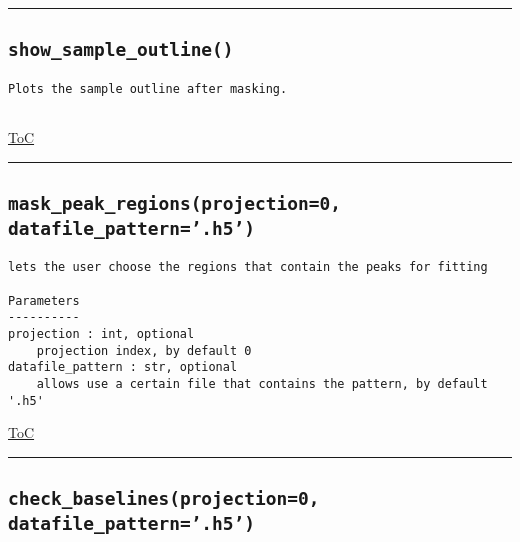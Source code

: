\documentclass{article}
\begin{document}
\vspace{5mm}

\hrule

\subsection*{\texttt{show\_sample\_outline()}}
\label{fun:showsampleoutline}

\begin{lstlisting}[language=docstring]
Plots the sample outline after masking.
    
\end{lstlisting}

\begin{flushright}

\hyperref[toc]{ToC}

\end{flushright}



\vspace{5mm}

\hrule

\subsection*{\texttt{mask\_peak\_regions(projection=0, datafile\_pattern='.h5')}}
\label{fun:maskpeakregions}

\begin{lstlisting}[language=docstring]
lets the user choose the regions that contain the peaks for fitting

Parameters
----------
projection : int, optional
    projection index, by default 0
datafile_pattern : str, optional
    allows use a certain file that contains the pattern, by default '.h5'
\end{lstlisting}

\begin{flushright}

\hyperref[toc]{ToC}

\end{flushright}



\vspace{5mm}

\hrule

\subsection*{\texttt{check\_baselines(projection=0, datafile\_pattern='.h5')}}
\label{fun:checkbaselines}
\end{document}
